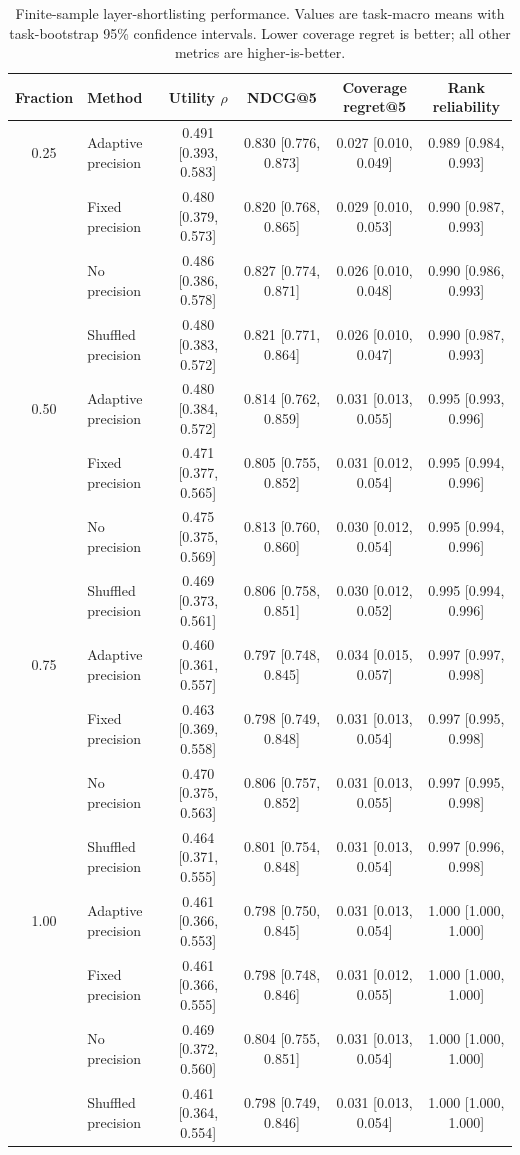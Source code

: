 \begin{table}[t]
\centering
\small
\caption{Finite-sample layer-shortlisting performance. Values are task-macro means with task-bootstrap 95\% confidence intervals. Lower coverage regret is better; all other metrics are higher-is-better.}
\label{tab:finite_sample_precision_performance}
\begin{tabular}{clcccc}
\toprule
Fraction & Method & Utility $\rho$ & NDCG@5 & Coverage regret@5 & Rank reliability \\
\midrule
0.25 & Adaptive precision & 0.491 [0.393, 0.583] & 0.830 [0.776, 0.873] & 0.027 [0.010, 0.049] & 0.989 [0.984, 0.993] \\
 & Fixed precision & 0.480 [0.379, 0.573] & 0.820 [0.768, 0.865] & 0.029 [0.010, 0.053] & 0.990 [0.987, 0.993] \\
 & No precision & 0.486 [0.386, 0.578] & 0.827 [0.774, 0.871] & 0.026 [0.010, 0.048] & 0.990 [0.986, 0.993] \\
 & Shuffled precision & 0.480 [0.383, 0.572] & 0.821 [0.771, 0.864] & 0.026 [0.010, 0.047] & 0.990 [0.987, 0.993] \\
\midrule
0.50 & Adaptive precision & 0.480 [0.384, 0.572] & 0.814 [0.762, 0.859] & 0.031 [0.013, 0.055] & 0.995 [0.993, 0.996] \\
 & Fixed precision & 0.471 [0.377, 0.565] & 0.805 [0.755, 0.852] & 0.031 [0.012, 0.054] & 0.995 [0.994, 0.996] \\
 & No precision & 0.475 [0.375, 0.569] & 0.813 [0.760, 0.860] & 0.030 [0.012, 0.054] & 0.995 [0.994, 0.996] \\
 & Shuffled precision & 0.469 [0.373, 0.561] & 0.806 [0.758, 0.851] & 0.030 [0.012, 0.052] & 0.995 [0.994, 0.996] \\
\midrule
0.75 & Adaptive precision & 0.460 [0.361, 0.557] & 0.797 [0.748, 0.845] & 0.034 [0.015, 0.057] & 0.997 [0.997, 0.998] \\
 & Fixed precision & 0.463 [0.369, 0.558] & 0.798 [0.749, 0.848] & 0.031 [0.013, 0.054] & 0.997 [0.995, 0.998] \\
 & No precision & 0.470 [0.375, 0.563] & 0.806 [0.757, 0.852] & 0.031 [0.013, 0.055] & 0.997 [0.995, 0.998] \\
 & Shuffled precision & 0.464 [0.371, 0.555] & 0.801 [0.754, 0.848] & 0.031 [0.013, 0.054] & 0.997 [0.996, 0.998] \\
\midrule
1.00 & Adaptive precision & 0.461 [0.366, 0.553] & 0.798 [0.750, 0.845] & 0.031 [0.013, 0.054] & 1.000 [1.000, 1.000] \\
 & Fixed precision & 0.461 [0.366, 0.555] & 0.798 [0.748, 0.846] & 0.031 [0.012, 0.055] & 1.000 [1.000, 1.000] \\
 & No precision & 0.469 [0.372, 0.560] & 0.804 [0.755, 0.851] & 0.031 [0.013, 0.054] & 1.000 [1.000, 1.000] \\
 & Shuffled precision & 0.461 [0.364, 0.554] & 0.798 [0.749, 0.846] & 0.031 [0.013, 0.054] & 1.000 [1.000, 1.000] \\
\bottomrule
\end{tabular}
\end{table}
